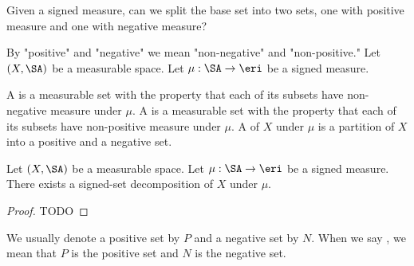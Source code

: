 
\sbasic



\sstart



Given a signed measure,
can we split
the base set into two sets,
one with positive measure
and one with negative measure?


By "positive" and "negative"
we mean "non-negative"
and "non-positive."
Let $(X, \SA)$ be
a measurable space.
Let $\mu: \SA \to \eri$
be a signed measure.

A 
is a measurable set
with the property that
each of its subsets have
non-negative measure
under $\mu$.
A 
is a measurable set
with the property that
each of its subsets have
non-positive measure
under $\mu$.
A 
of $X$ under $\mu$
is a partition of $X$
into a positive and a negative set.

\begin{prop}
Let $(X, \SA)$ be
a measurable space.
Let $\mu: \SA \to \eri$
be a signed measure.
There exists a signed-set
decomposition of $X$ under $\mu$.
  \begin{proof}
    TODO
  \end{proof}
\end{prop}




We usually denote a positive
set by $P$ and a negative set
by $N$.
When we say ,
we mean that $P$ is
the positive set and $N$
is the negative set.

\strats
